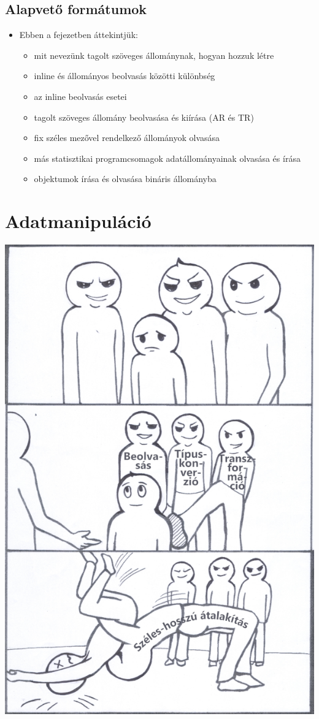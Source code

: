 \documentclass[
]{book}
\providecommand{\tightlist}{%
  \setlength{\itemsep}{0pt}\setlength{\parskip}{0pt}}
\newenvironment{rmdblock}[1]
  {\begin{shaded*}
  \begin{itemize}
  \renewcommand{\labelitemi}{
    \raisebox{-.7\height}[0pt][0pt]{
      {\setkeys{Gin}{width=3em,keepaspectratio}\texttt{[image: images/\#1]}}
    }
  }
  \item
  }
  {
  \end{itemize}
  \end{shaded*}
  }
\newenvironment{rmdlevel1}
  {\begin{rmdblock}{level1}}
  {\end{rmdblock}}
\begin{document}
\hypertarget{beolvas-kiir}{%
\section{Alapvető formátumok}\label{beolvas-kiir}}

\begin{rmdlevel1}
Ebben a fejezetben áttekintjük:

\begin{itemize}
\tightlist
\item
  mit nevezünk tagolt szöveges állománynak, hogyan hozzuk létre
\item
  inline és állományos beolvasás közötti különbség
\item
  az inline beolvasás esetei
\item
  tagolt szöveges állomány beolvasása és kiírása (AR és TR)
\item
  fix széles mezővel rendelkező állományok olvasása
\item
  más statisztikai programcsomagok adatállományainak olvasása és írása
\item
  objektumok írása és olvasása bináris állományba
\end{itemize}
\end{rmdlevel1}

\hypertarget{adatmanipulacio}{%
\chapter{Adatmanipuláció}\label{adatmanipulacio}}

\begin{center}\includegraphics[width=0.7\linewidth]{images/ch_07_small} \end{center}
\end{document}
